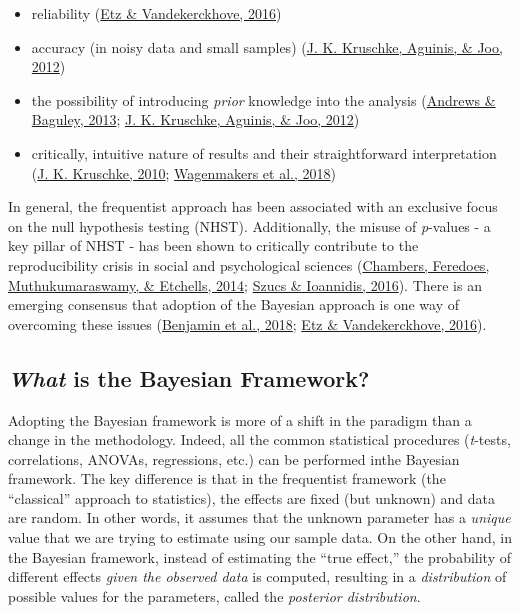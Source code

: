 \documentclass[10pt,a4paper,onecolumn]{article}
\providecommand{\tightlist}{%
  \setlength{\itemsep}{0pt}\setlength{\parskip}{0pt}}
\begin{document}
\begin{itemize}
\tightlist
\item
  reliability (\protect\hyperlink{ref-etz2016bayesian}{Etz \&
  Vandekerckhove, 2016})
\item
  accuracy (in noisy data and small samples)
  (\protect\hyperlink{ref-kruschke2012time}{J. K. Kruschke, Aguinis, \&
  Joo, 2012})
\item
  the possibility of introducing \emph{prior} knowledge into the
  analysis (\protect\hyperlink{ref-andrews2013prior}{Andrews \& Baguley,
  2013}; \protect\hyperlink{ref-kruschke2012time}{J. K. Kruschke,
  Aguinis, \& Joo, 2012})
\item
  critically, intuitive nature of results and their straightforward
  interpretation (\protect\hyperlink{ref-kruschke2010believe}{J. K.
  Kruschke, 2010};
  \protect\hyperlink{ref-wagenmakers2018bayesian}{Wagenmakers et al.,
  2018})
\end{itemize}

In general, the frequentist approach has been associated with an
exclusive focus on the null hypothesis testing (NHST). Additionally, the
misuse of \emph{p}-values - a key pillar of NHST - has been shown to
critically contribute to the reproducibility crisis in social and
psychological sciences
(\protect\hyperlink{ref-chambers2014instead}{Chambers, Feredoes,
Muthukumaraswamy, \& Etchells, 2014};
\protect\hyperlink{ref-szucs2016empirical}{Szucs \& Ioannidis, 2016}).
There is an emerging consensus that adoption of the Bayesian approach is
one way of overcoming these issues
(\protect\hyperlink{ref-benjamin2018redefine}{Benjamin et al., 2018};
\protect\hyperlink{ref-etz2016bayesian}{Etz \& Vandekerckhove, 2016}).

\hypertarget{what-is-the-bayesian-framework}{%
\subsection{\texorpdfstring{\emph{What} is the Bayesian
Framework?}{What is the Bayesian Framework?}}\label{what-is-the-bayesian-framework}}

Adopting the Bayesian framework is more of a shift in the paradigm than
a change in the methodology. Indeed, all the common statistical
procedures (\emph{t}-tests, correlations, ANOVAs, regressions, etc.) can
be performed inthe Bayesian framework. The key difference is that in the
frequentist framework (the ``classical'' approach to statistics), the
effects are fixed (but unknown) and data are random. In other words, it
assumes that the unknown parameter has a \emph{unique} value that we are
trying to estimate using our sample data. On the other hand, in the
Bayesian framework, instead of estimating the ``true effect,'' the
probability of different effects \emph{given the observed data} is
computed, resulting in a \emph{distribution} of possible values for the
parameters, called the \emph{posterior distribution}.
\end{document}

